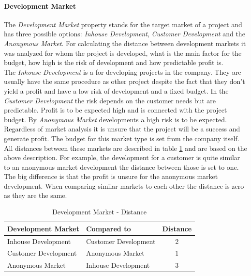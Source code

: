 \paragraph*{\textbf{Development Market}}
The \textit{Development Market} property stands for the target market of a project and has three possible options: \textit{Inhouse Development}, \textit{Customer Development} and the \textit{Anonymous Market}. For calculating the distance between development markets it was analyzed for whom the project is developed, what is the main factor for the budget, how high is the risk of development and how predictable profit is.\\ 
The \textit{Inhouse Development} is a for developing projects in the company. They are usually have the same procedure as other project despite the fact that they don't yield a profit and have a low risk of development and a fixed budget. In the \textit{Customer Development} the risk depends on the customer needs but are predictable. Profit is to be expected high and is connected with the project budget. By \textit{Anonymous Market} developments a high risk is to be expected. Regardless of market analysis it is unsure that the project will be a success and generate profit. The budget for this market type is set from the company itself.\\
All distances between these markets are described in table \ref{property:devmarket} and are based on the above description. For example, the development for a customer is quite similar to an anonymous market development the distance between those is set to one. The big difference is that the profit is unsure for the anonymous market development. When comparing similar markets to each other the distance is zero as they are the same.
\begin{table}[h]
	\centering 
	\setlength{\tabcolsep}{4pt}
	\begin{tabular}{|l|l|c|}\hline
		Development Market		& Compared to 			&  Distance 	\\ \hline
		Inhouse Development   	& Customer Development	& 2      		\\ \hline
		Customer Development   	& Anonymous Market 		& 1      		\\ \hline
		Anonymous Market   		& Inhouse Development 	& 3     		\\ \hline
	\end{tabular} 
	\caption{Development Market - Distance} 
	\label{property:devmarket} 
\end{table}
